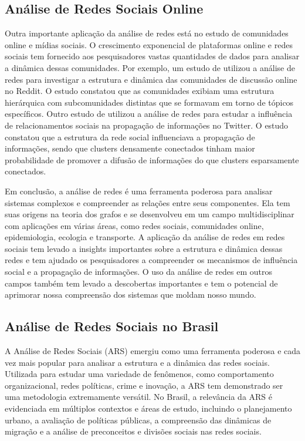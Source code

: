 \subsection*{Análise de Redes Sociais Online}

Outra importante aplicação da análise de redes está no estudo de comunidades online e mídias sociais. O crescimento exponencial de plataformas online e redes sociais tem fornecido aos pesquisadores vastas quantidades de dados para analisar a dinâmica dessas comunidades. Por exemplo, um estudo de utilizou a análise de redes para investigar a estrutura e dinâmica das comunidades de discussão online no Reddit. O estudo constatou que as comunidades exibiam uma estrutura hierárquica com subcomunidades distintas que se formavam em torno de tópicos específicos. Outro estudo de  utilizou a análise de redes para estudar a influência de relacionamentos sociais na propagação de informações no Twitter. O estudo constatou que a estrutura da rede social influenciava a propagação de informações, sendo que clusters densamente conectados tinham maior probabilidade de promover a difusão de informações do que clusters esparsamente conectados.

Em conclusão, a análise de redes é uma ferramenta poderosa para analisar sistemas complexos e compreender as relações entre seus componentes. Ela tem suas origens na teoria dos grafos e se desenvolveu em um campo multidisciplinar com aplicações em várias áreas, como redes sociais, comunidades online, epidemiologia, ecologia e transporte. A aplicação da análise de redes em redes sociais tem levado a insights importantes sobre a estrutura e dinâmica dessas redes e tem ajudado os pesquisadores a compreender os mecanismos de influência social e a propagação de informações. O uso da análise de redes em outros campos também tem levado a descobertas importantes e tem o potencial de aprimorar nossa compreensão dos sistemas que moldam nosso mundo.

\subsection*{Análise de Redes Sociais no Brasil}

A Análise de Redes Sociais (ARS) emergiu como uma ferramenta poderosa e cada vez mais popular para analisar a estrutura e a dinâmica das redes sociais. Utilizada para estudar uma variedade de fenômenos, como comportamento organizacional, redes políticas, crime e inovação, a ARS tem demonstrado ser uma metodologia extremamente versátil. No Brasil, a relevância da ARS é evidenciada em múltiplos contextos e áreas de estudo, incluindo o planejamento urbano, a avaliação de políticas públicas, a compreensão das dinâmicas de migração e a análise de preconceitos e divisões sociais nas redes sociais.

